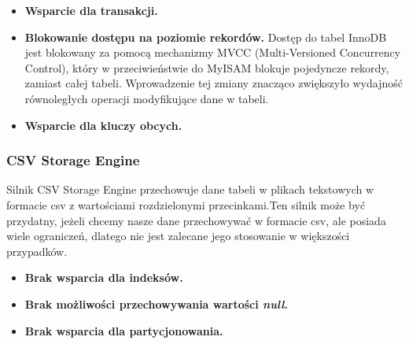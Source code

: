 \begin{itemize}
	\item \textbf{Wsparcie dla transakcji. }
	\item \textbf{Blokowanie dostępu na poziomie rekordów. } Dostęp do tabel InnoDB jest blokowany za pomocą mechanizmy MVCC (Multi-Versioned Concurrency Control), który w przeciwieństwie do MyISAM blokuje pojedyncze rekordy, zamiast całej tabeli. Wprowadzenie tej zmiany znacząco zwiększyło wydajność równoległych operacji modyfikujące dane w tabeli.
	\item \textbf{Wsparcie dla kluczy obcych.}
\end{itemize}

\subsubsection{CSV Storage Engine}
Silnik CSV Storage Engine przechowuje dane tabeli w plikach tekstowych w formacie csv z wartościami rozdzielonymi przecinkami.Ten silnik może być przydatny, jeżeli chcemy nasze dane przechowywać w formacie csv, ale posiada wiele ograniczeń, dlatego nie jest zalecane jego stosowanie w większości przypadków.

\begin{itemize}
	\item \textbf{Brak wsparcia dla indeksów.}
	\item \textbf{Brak możliwości przechowywania wartości \textit{null}.}
	\item \textbf{Brak wsparcia dla partycjonowania.}
\end{itemize}

